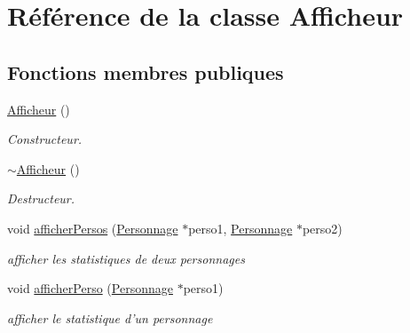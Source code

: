 \hypertarget{classAfficheur}{\section{Référence de la classe Afficheur}
\label{classAfficheur}
}
\subsection*{Fonctions membres publiques}
\begin{DoxyCompactItemize}
\item 
\hypertarget{classAfficheur_a007dbdbc0894dbf96db2cea82af9577b}{\hyperlink{classAfficheur_a007dbdbc0894dbf96db2cea82af9577b}{Afficheur} ()}\label{classAfficheur_a007dbdbc0894dbf96db2cea82af9577b}

\begin{DoxyCompactList}\small\item\em Constructeur. \end{DoxyCompactList}\item 
\hypertarget{classAfficheur_a9b0194e4c1c7bd3a818f8a2725fe73b0}{\hyperlink{classAfficheur_a9b0194e4c1c7bd3a818f8a2725fe73b0}{$\sim$\-Afficheur} ()}\label{classAfficheur_a9b0194e4c1c7bd3a818f8a2725fe73b0}

\begin{DoxyCompactList}\small\item\em Destructeur. \end{DoxyCompactList}\item 
void \hyperlink{classAfficheur_abf9d4a2be48a5347a7b9faf440cb5f35}{afficher\-Persos} (\hyperlink{classPersonnage}{Personnage} $\ast$perso1, \hyperlink{classPersonnage}{Personnage} $\ast$perso2)
\begin{DoxyCompactList}\small\item\em afficher les statistiques de deux personnages \end{DoxyCompactList}\item 
void \hyperlink{classAfficheur_ae7cc6b7ab9167866261941632227bd0e}{afficher\-Perso} (\hyperlink{classPersonnage}{Personnage} $\ast$perso1)
\begin{DoxyCompactList}\small\item\em afficher le statistique d'un personnage \end{DoxyCompactList}\end{DoxyCompactItemize}


